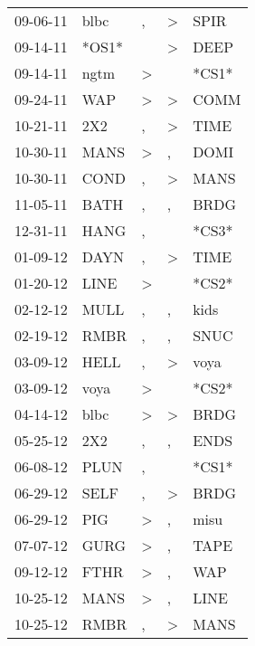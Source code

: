 \begin{supertabular}{lllll}
 09-06-11 &   blbc &                , &     \textgreater &   SPIR \\
 09-14-11 &  *OS1* &                  &     \textgreater &   DEEP \\
 09-14-11 &   ngtm &     \textgreater &                  &  *CS1* \\
 09-24-11 &    WAP &     \textgreater &     \textgreater &   COMM \\
 10-21-11 &    2X2 &                , &     \textgreater &   TIME \\
 10-30-11 &   MANS &     \textgreater &                , &   DOMI \\
 10-30-11 &   COND &                , &     \textgreater &   MANS \\
 11-05-11 &   BATH &                , &                , &   BRDG \\
 12-31-11 &   HANG &                , &                  &  *CS3* \\
 01-09-12 &   DAYN &                , &     \textgreater &   TIME \\
 01-20-12 &   LINE &     \textgreater &                  &  *CS2* \\
 02-12-12 &   MULL &                , &                , &   kids \\
 02-19-12 &   RMBR &                , &                , &   SNUC \\
 03-09-12 &   HELL &                , &     \textgreater &   voya \\
 03-09-12 &   voya &     \textgreater &                  &  *CS2* \\
 04-14-12 &   blbc &     \textgreater &     \textgreater &   BRDG \\
 05-25-12 &    2X2 &                , &                , &   ENDS \\
 06-08-12 &   PLUN &                , &                  &  *CS1* \\
 06-29-12 &   SELF &                , &     \textgreater &   BRDG \\
 06-29-12 &    PIG &     \textgreater &                , &   misu \\
 07-07-12 &   GURG &     \textgreater &                , &   TAPE \\
 09-12-12 &   FTHR &     \textgreater &                , &    WAP \\
 10-25-12 &   MANS &     \textgreater &                , &   LINE \\
 10-25-12 &   RMBR &                , &     \textgreater &   MANS \\

\end{supertabular}
